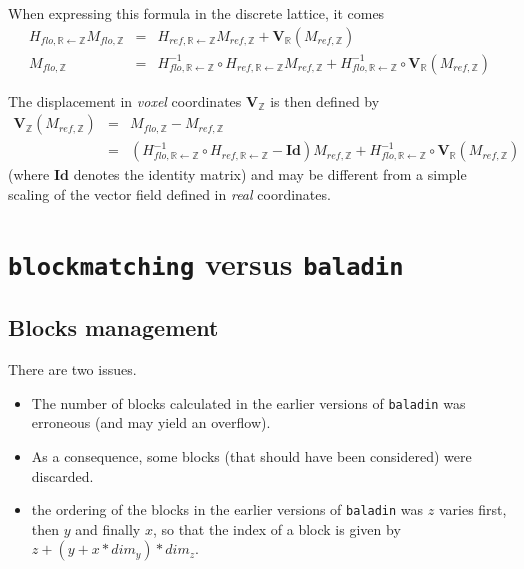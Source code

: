 \documentclass[10pt]{report}
\def\baladin{\texttt{baladin} }
\def\blockmatching{\texttt{blockmatching} }
\begin{document}
When expressing this formula in the discrete lattice, it comes
\begin{eqnarray*}
 H_{flo, \mathbb{R} \leftarrow \mathbb{Z}} M_{flo,\mathbb{Z}}
 & = & 
 H_{ref, \mathbb{R} \leftarrow \mathbb{Z}} M_{ref,\mathbb{Z}}
 + \mathbf{V}_{\mathbb{R}}( M_{ref,\mathbb{Z}} ) \\
 M_{flo,\mathbb{Z}} 
 &= &
 H^{-1}_{flo, \mathbb{R} \leftarrow \mathbb{Z}}
 \circ H_{ref, \mathbb{R} \leftarrow \mathbb{Z}} M_{ref,\mathbb{Z}}
 + H^{-1}_{flo, \mathbb{R} \leftarrow \mathbb{Z}}
 \circ \mathbf{V}_{\mathbb{R}}( M_{ref,\mathbb{Z}} )
\end{eqnarray*}

The displacement in \textit{voxel} coordinates $\mathbf{V}_{\mathbb{Z}}$ is then defined by
\begin{eqnarray*}
\mathbf{V}_{\mathbb{Z}}( M_{ref,\mathbb{Z}} )
& = & M_{flo,\mathbb{Z}} - M_{ref,\mathbb{Z}} \\
& = & 
\left( H^{-1}_{flo, \mathbb{R} \leftarrow \mathbb{Z}}
 \circ H_{ref, \mathbb{R} \leftarrow \mathbb{Z}} - \mathbf{Id} \right)
 M_{ref,\mathbb{Z}}
 + H^{-1}_{flo, \mathbb{R} \leftarrow \mathbb{Z}}
 \circ \mathbf{V}_{\mathbb{R}}( M_{ref,\mathbb{Z}} )
\end{eqnarray*}
(where $\mathbf{Id}$ denotes the identity matrix) and may be different from a simple scaling of the vector field defined in \textit{real} coordinates.




\section{\blockmatching versus \baladin}

\subsection{Blocks management}

There are two issues.

\begin{itemize}

\item The number of blocks calculated in the earlier versions of \baladin was erroneous (and may yield an overflow). 
\item As a consequence, some blocks (that should have been considered) were discarded.
\item the ordering of the blocks in the earlier versions of \baladin was $z$ varies first, then $y$ and finally $x$, so that the index of a block is given by $z + ( y + x * dim_y) * dim_z$. 

\end{itemize}
\end{document}
